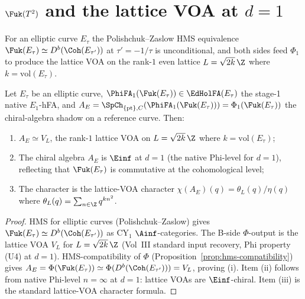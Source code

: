 \section{\texorpdfstring{$\Fuk(T^2)$}{Fuk(T-2)} and the lattice VOA at \texorpdfstring{$d = 1$}{d = 1}}
\label{sec:fukaya-t2-lattice}

For an elliptic curve $E_\tau$ the Polishchuk--Zaslow HMS
equivalence $\Fuk(E_\tau) \simeq D^b(\Coh(E_{\tau'}))$ at
$\tau' = -1/\tau$ is unconditional, and both sides feed $\Phi_1$
to produce the lattice VOA on the rank-$1$ even lattice
$L = \sqrt{2k}\,\Z$ where $k = \mathrm{vol}(E_\tau)$.

\begin{proposition}
\label{prop:fukaya-elliptic-lattice}
Let $E_\tau$ be an elliptic curve, $\PhiFA_1(\Fuk(E_\tau)) \in \EdHolFA(E_\tau)$
the stage-1 native $E_1$-hFA, and
$A_E = \SpCh_{\{\mathrm{pt}\}, C}(\PhiFA_1(\Fuk(E_\tau))) = \Phi_1(\Fuk(E_\tau))$
the chiral-algebra shadow on a reference curve. Then:
\begin{enumerate}[label=(\roman*)]
 \item $A_E \simeq V_L$, the rank-$1$ lattice VOA on
 $L = \sqrt{2k}\,\Z$ where $k = \mathrm{vol}(E_\tau)$;
 \item The chiral algebra $A_E$ is $\Einf$ at $d = 1$ (the native
 Phi-level for $d = 1$), reflecting that $\Fuk(E_\tau)$ is
 commutative at the cohomological level;
 \item The character is the lattice-VOA character
 $\chi(A_E)(q) = \theta_L(q) / \eta(q)$ where
 $\theta_L(q) = \sum_{n \in \Z} q^{kn^2}$.
\end{enumerate}
\end{proposition}

\begin{proof}
HMS for elliptic curves (Polishchuk--Zaslow) gives
$\Fuk(E_\tau) \simeq D^b(\Coh(E_{\tau'}))$ as CY$_1$
$\Ainf$-categories. The B-side $\Phi$-output is the lattice VOA
$V_L$ for $L = \sqrt{2k}\,\Z$ (Vol~III standard input recovery,
Phi property (U4) at $d = 1$). HMS-compatibility of $\Phi$
(Proposition~\ref{prop:hms-compatibility}) gives
$A_E = \Phi(\Fuk(E_\tau)) \simeq \Phi(D^b(\Coh(E_{\tau'}))) = V_L$,
proving (i). Item (ii) follows from native Phi-level
$n = \infty$ at $d = 1$: lattice VOAs are $\Einf$-chiral. Item
(iii) is the standard lattice-VOA character formula.
\end{proof}


